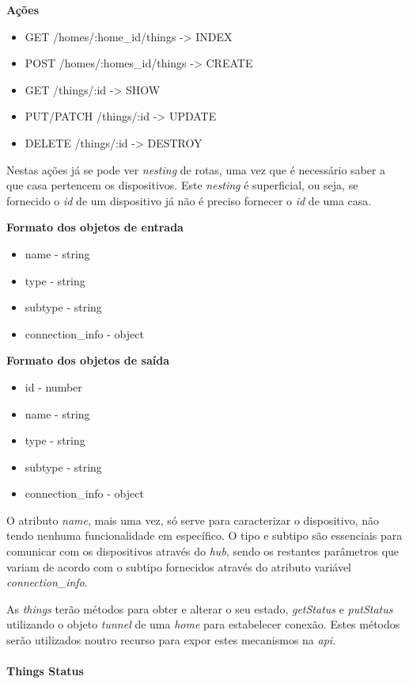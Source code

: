 \textbf{Ações}
\begin{itemize}
    \item GET /homes/:home\_id/things -> INDEX
    \item POST /homes/:homes\_id/things -> CREATE
    \item GET /things/:id -> SHOW
    \item PUT/PATCH /things/:id -> UPDATE
    \item DELETE /things/:id -> DESTROY
\end{itemize}

Nestas ações já se pode ver \textit{nesting} de rotas, uma vez que é necessário saber a que casa pertencem os dispositivos. Este \textit{nesting} é superficial, ou seja, se fornecido o \textit{id} de um dispositivo já não é preciso fornecer o \textit{id} de uma casa.

\textbf{Formato dos objetos de entrada}
\begin{itemize}
    \item name - string
    \item type - string
    \item subtype - string
    \item connection\_info - object
\end{itemize}

\textbf{Formato dos objetos de saída}
\begin{itemize}
    \item id - number
    \item name - string
    \item type - string
    \item subtype - string
    \item connection\_info - object
\end{itemize}

O atributo \textit{name}, mais uma vez, só serve para caracterizar o dispositivo, não tendo nenhuma funcionalidade em específico. O tipo e subtipo são essenciais para comunicar com os dispositivos através do \textit{hub}, sendo os restantes parâmetros que variam de acordo com o subtipo fornecidos através do atributo variável \textit{connection\_info}.

As \textit{things} terão métodos para obter e alterar o seu estado, \textit{getStatus} e \textit{putStatus} utilizando o objeto \textit{tunnel} de uma \textit{home} para estabelecer conexão. Estes métodos serão utilizados noutro recurso para expor estes mecanismos na \textit{api}.

\paragraph*{Things Status}

